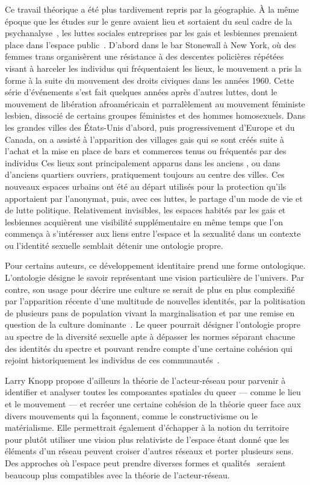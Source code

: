 Ce travail théorique a été plus tardivement repris par la géographie.
À la même époque que les études sur le genre avaient lieu et sortaient du seul cadre de la psychanalyse~\citep{Rubin2011a,Rubin2011}, les luttes sociales entreprises par les gais et lesbiennes prenaient place dans l'espace public~\citep[422-427]{Spencer2005}.
D'abord dans le bar Stonewall à New York, où des femmes trans organisèrent une résistance à des descentes policières répétées visant à harceler les individus \lgbt{} qui fréquentaient les lieux, le mouvement a pris la forme à la suite du mouvement des droits civiques dans les années 1960.
Cette série d'événements s'est fait quelques années après d'autres luttes, dont le mouvement de libération afroaméricain et parralèlement au mouvement féministe lesbien, dissocié de certains groupes féministes et des hommes homosexuels.
Dans les grandes villes des États-Unis d'abord, puis progressivement d'Europe et du Canada, on a assisté à l'apparition des villages gais qui se sont créés suite à l'achat et la mise en place de bars et commerces tenus ou fréquentés par des individus \lgbt{}
Ces lieux sont principalement apparus dans les anciens , ou dans d'anciens quartiers ouvriers, pratiquement toujours au centre des villes.
Ces nouveaux espaces urbains ont été au départ utilisés pour la protection qu'ils apportaient par l'anonymat, puis, avec ces luttes, le partage d'un mode de vie et de lutte politique.
Relativement invisibles, les espaces  habités par les gais et lesbiennes acquièrent une visibilité supplémentaire en même temps que l'on commença à s'intéresser aux liens entre l'espace et la sexualité dans un contexte ou l'identité sexuelle semblait détenir une ontologie propre.

Pour certains auteurs, ce développement identitaire prend une forme ontologique.
L'ontologie désigne le savoir représentant une vision particulière de l'univers.
Par contre, son usage pour décrire une culture se serait de plus en plus complexifié par l'apparition récente d'une multitude de nouvelles identités, par la politisation de plusieurs pans de population vivant la marginalisation et par une remise en question de la culture dominante~\citep[122]{Knopp2004}.
Le queer pourrait désigner l'ontologie propre au spectre de la diversité sexuelle apte à dépasser les normes séparant chacune des identités du spectre \lgbt{} et pouvant rendre compte d'une certaine cohésion qui rejoint historiquement les individus de ces communautés~\citep[122]{Knopp2004}.

Larry Knopp propose d'ailleurs la théorie de l'acteur-réseau pour parvenir à identifier et analyser toutes les composantes spatiales du queer --- comme le lieu et le mouvement --- et recréer une certaine cohésion de la théorie queer face aux divers mouvements qui la façonnent, comme le constructivisme ou le matérialisme.
Elle permettrait également d'échapper à la notion du territoire pour plutôt utiliser une vision plus relativiste de l'espace étant donné que les éléments d'un réseau peuvent croiser d'autres réseaux et porter plusieurs sens.
Des approches où l'espace peut prendre diverses formes et qualités~\citep{DiMeo1998} seraient beaucoup plus compatibles avec la théorie de l'acteur-réseau.

